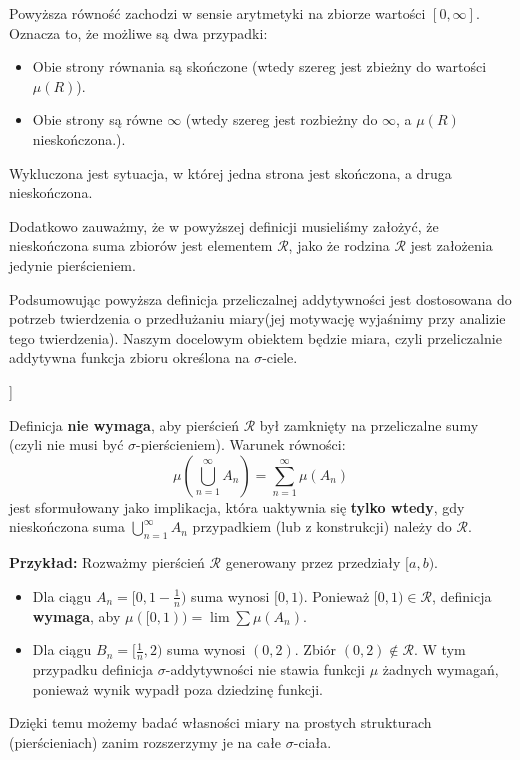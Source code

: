 \begin{remark}
	Powyższa równość zachodzi w sensie arytmetyki na zbiorze wartości $[0,\infty]$. Oznacza to, że możliwe są dwa przypadki: 
\begin{itemize} 
	\item Obie strony równania są skończone (wtedy szereg jest zbieżny do wartości $\mu\left( R \right) $). 
	\item Obie strony są równe $\infty$ (wtedy szereg jest rozbieżny do $\infty$, a $\mu\left( R \right) $ nieskończona.). 
\end{itemize}

Wykluczona jest sytuacja, w której jedna strona jest skończona, a druga nieskończona.

Dodatkowo zauważmy, że w powyższej definicji musieliśmy założyć, że nieskończona suma zbiorów jest elementem $\mathcal{R}$, jako że rodzina $\mathcal{R}$ jest założenia jedynie pierścieniem. 

	Podsumowując powyższa definicja przeliczalnej addytywności jest dostosowana do potrzeb twierdzenia o przedłużaniu miary(jej motywację wyjaśnimy przy analizie tego twierdzenia). Naszym docelowym obiektem będzie miara, czyli przeliczalnie addytywna funkcja zbioru określona na $\sigma$-ciele. 
\end{remark} ]
\begin{remark}
    Definicja \textbf{nie wymaga}, aby pierścień $\mathcal{R}$ był zamknięty na przeliczalne sumy (czyli nie musi być $\sigma$-pierścieniem). Warunek równości:
    \[
    \mu \left( \bigcup_{n=1}^{\infty} A_{n}\right) = \sum_{n=1}^{\infty}\mu \left( A_{n} \right)
    \]
    jest sformułowany jako implikacja, która uaktywnia się \textbf{tylko wtedy}, gdy nieskończona suma $\bigcup_{n=1}^{\infty} A_{n}$ przypadkiem (lub z konstrukcji) należy do $\mathcal{R}$.

    \textbf{Przykład:}
    Rozważmy pierścień $\mathcal{R}$ generowany przez przedziały $[a, b)$.
    \begin{itemize}
        \item Dla ciągu $A_n = [0, 1 - \frac{1}{n})$ suma wynosi $[0, 1)$. Ponieważ $[0, 1) \in \mathcal{R}$, definicja \textbf{wymaga}, aby $\mu([0, 1)) = \lim \sum \mu(A_n)$.
        \item Dla ciągu $B_n = [\frac{1}{n}, 2)$ suma wynosi $(0, 2)$. Zbiór $(0, 2) \notin \mathcal{R}$. W tym przypadku definicja $\sigma$-addytywności nie stawia funkcji $\mu$ żadnych wymagań, ponieważ wynik wypadł poza dziedzinę funkcji.
    \end{itemize}
    Dzięki temu możemy badać własności miary na prostych strukturach (pierścieniach) zanim rozszerzymy je na całe $\sigma$-ciała.
\end{remark}

